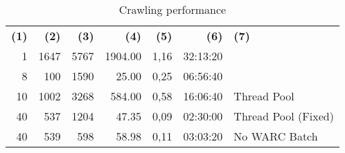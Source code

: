 \begin{table}[!ht] \centering
  \caption{Crawling performance} \label{performance}
  \begin{tabular}{rrrrrrl}
    \textbf{(1)} & \textbf{(2)} & \textbf{(3)} & \textbf{(4)} & \textbf{(5)} & \textbf{(6)}      & \textbf{(7)}             \\
    1            & 1647         & 5767         & 1904.00      & 1,16         & 32:13:20          &                          \\
    8            & 100          & 1590         & 25.00        & 0,25         & 06:56:40          &                          \\
    10           & 1002         & 3268         & 584.00       & 0,58         & 16:06:40          & Thread Pool              \\
    40           & 537          & 1204         & 47.35        & 0,09         & 02:30:00          & Thread Pool (Fixed)      \\
    40           & 539          & 598          & 58.98        & 0,11         & 03:03:20          & No WARC Batch            \\

\end{tabular}
\end{table}
